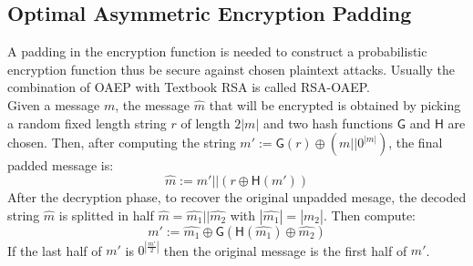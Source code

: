 \subsection{Optimal Asymmetric Encryption Padding}
A padding in the encryption function is needed to construct a probabilistic encryption function thus be secure against chosen plaintext attacks. Usually the combination of OAEP with Textbook RSA is called RSA-OAEP.\\
Given a message $m$, the message $\hat{m}$ that will be encrypted is obtained by picking a random fixed length string $r$ of length $2|m|$ and two hash functions $\mathsf{G}$ and $\mathsf{H}$ are chosen. Then, after computing the string $m' := \mathsf{G}(r) \oplus (m||0^{|m|})$, the final padded message is:
$$
    \hat{m} := m'||(r \oplus \mathsf{H}(m'))
$$
After the decryption phase, to recover the original unpadded mesage, the decoded string $\hat{m}$ is splitted in half $\hat{m} = \hat{m_1}||\hat{m_2}$ with $|\hat{m_1}|=|\hat{m_2}|$. Then compute:
$$
    m' := \hat{m_1} \oplus \mathsf{G}(\mathsf{H}(\hat{m_1}) \oplus \hat{m_2})
$$
If the last half of $m'$ is $0^{|\frac{m'}{2}|}$ then the original message is the first half of $m'$.
